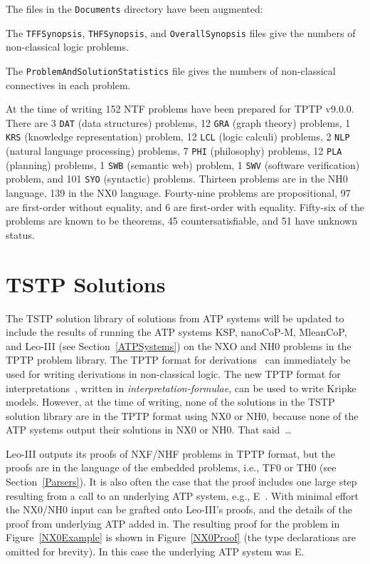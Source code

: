 \documentclass{ceurart}
\newenvironment{packed_itemize}{
\vspace*{-0.5em}
\begin{itemize}
\setlength{\partopsep}{0pt}
\setlength{\itemsep}{1pt}
\setlength{\parskip}{0pt}
\setlength{\parsep}{0pt}
}{\end{itemize}}
\begin{document}
The files in the {\tt Documents} directory have been augmented:
\begin{packed_itemize}
\item The {\tt TFFSynopsis}, {\tt THFSynopsis}, and {\tt OverallSynopsis} files give the numbers 
      of non-classical logic problems.
\item The {\tt ProblemAndSolutionStatistics} file gives the numbers of non-classical
      connectives in each problem.
\end{packed_itemize}

At the time of writing 152 NTF problems have been prepared for TPTP v9.0.0.
There are 3 {\tt DAT} (data structures) problems, 12 {\tt GRA} (graph theory) problems, 
1 {\tt KRS} (knowledge representation) problem, 12 {\tt LCL} (logic calculi) problems, 
2 {\tt NLP} (natural language processing) problems, 7 {\tt PHI} (philosophy) problems,
12 {\tt PLA} (planning) problems, 1 {\tt SWB} (semantic web) problem, 1 {\tt SWV} (software 
verification) problem, and 101 {\tt SYO} (syntactic) problems.
Thirteen problems are in the NH0 language, 139 in the NX0 language.
Fourty-nine problems are propositional, 97 are first-order without equality, and 6 are
first-order with equality.
Fifty-six of the problems are known to be theorems, 45 countersatisfiable, and 51 have unknown
status.

\section{TSTP Solutions}
\label{TSTP}

The TSTP solution library of solutions from ATP systems will be updated to include the results 
of running the ATP systems KSP, nanoCoP-M, MleanCoP, and Leo-III (see Section~\ref{ATPSystems}) 
on the NXO and NH0 problems in the TPTP problem library.
The TPTP format for derivations~\cite{SS+06} can immediately be used for writing derivations in
non-classical logic.
The new TPTP format for interpretations~\cite{SS+23-LPAR}, written in 
{\em interpretation-formulae}, can be used to write Kripke models.
However, at the time of writing, none of the solutions in the TSTP solution library are in the 
TPTP format using NX0 or NH0, because none of the ATP systems output their solutions in NX0 or NH0.
That said~\ldots

Leo-III outputs its proofs of NXF/NHF problems in TPTP format, but the proofs are in the language 
of the embedded problems, i.e., TF0 or TH0 (see Section~\ref{Parsers}).
It is also often the case that the proof includes one large step resulting from a call to an 
underlying ATP system, e.g., E~\cite{SCV19}.
With minimal effort the NX0/NH0 input can be grafted onto Leo-III's proofs, and the details of
the proof from underlying ATP added in.
The resulting proof for the problem in Figure~\ref{NX0Example} is shown in Figure~\ref{NX0Proof} 
(the type declarations are omitted for brevity).
In this case the underlying ATP system was E.
\end{document}
